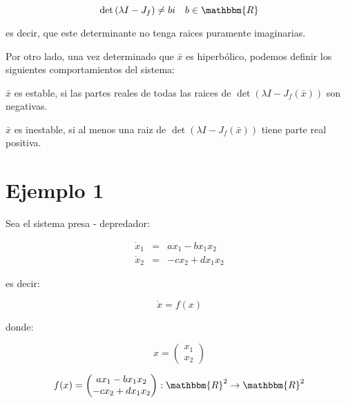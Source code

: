         \begin{equation}
            \det{(\lambda I - J_f)} \ne bi \quad b \in \mathbbm{R}
        \end{equation}

        es decir, que este determinante no tenga raices puramente imaginarias.

        Por otro lado, una vez determinado que $\bar{x}$ es hiperbólico, podemos definir los siguientes comportamientos del sistema:

        $\bar{x}$ es estable, si las partes reales de todas las raices de $\det{(\lambda I - J_f(\bar{x}))}$ son negativas.

        $\bar{x}$ es inestable, si al menos una raiz de $\det{(\lambda I - J_f(\bar{x}))}$ tiene parte real positiva.

    \section{Ejemplo 1}

        Sea el sistema presa - depredador:

        \begin{eqnarray*}
            \dot{x}_1 & = & a x_1 - b x_1 x_2 \\
            \dot{x}_2 & = & -c x_2 + d x_1 x_2
        \end{eqnarray*}

        es decir:

        \begin{equation*}
            \dot{x} = f(x)
        \end{equation*}

        donde:

        \begin{equation}
            x =
            \begin{pmatrix}
                x_1 \\
                x_2
            \end{pmatrix}
        \end{equation}

        \begin{equation} \label{eq:predep}
            f(x) =
            \begin{pmatrix}
                a x_1 - b x_1 x_2 \\
                -c x_2 + d x_1 x_2
            \end{pmatrix} : \mathbbm{R}^2 \to \mathbbm{R}^2 
        \end{equation}

